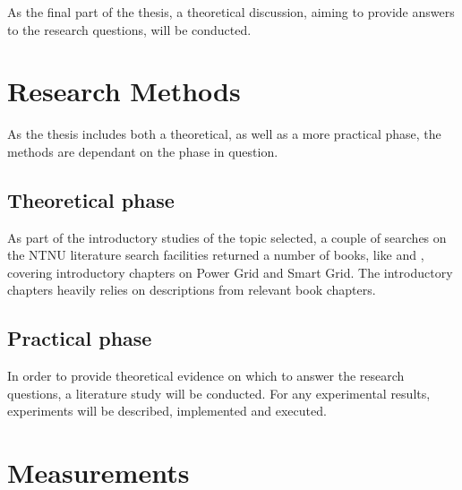 As the final part of the thesis, a theoretical discussion, aiming to provide answers to the research questions, will be conducted.\\ 



\section{Research Methods}
As the thesis includes both a theoretical, as well as a more practical phase, the methods are dependant on the phase in question.
\subsection{Theoretical phase}
As part of the introductory studies of the topic selected, a couple of searches on the NTNU literature search facilities returned a number of books, like \cite{BlumeStevenW2007Epsb} and \cite{kabalci2019smart}, covering introductory chapters on Power Grid and Smart Grid. The introductory chapters heavily relies on descriptions from relevant book chapters. 

\subsection{Practical phase}


In order to provide theoretical evidence on which to answer the research questions, a literature study will be conducted.
For any experimental results, experiments will be described, implemented and executed.

\section{Measurements}





